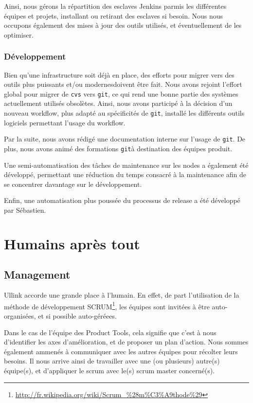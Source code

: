 \documentclass[a4paper, 12pt]{article}
\newcommand{\git}{\texttt{git}}
\begin{document}
Ainsi, nous gérons la répartition des esclaves Jenkins parmis les différentes équipes et projets, installant ou retirant des esclaves si besoin. Nous nous occupons également des mises à jour des outils utilisés, et éventuellement de les optimiser.

\subsubsection{Développement}

Bien qu'une infrastructure soit déjà en place, des efforts pour migrer vers des outils plus puissants et/ou modernesdoivent être fait. Nous avons rejoint l'effort global pour migrer de \texttt{cvs} vers \git, ce qui rend une bonne partie des systèmes actuellement utilisés obsolètes. Ainsi, nous avons participé à la décision d'un nouveau workflow, plus adapté au spécificités de \git, installé les différents outils logiciels permettant l'usage du workflow.

Par la suite, nous avons rédigé une documentation interne sur l'usage de \git. De plus, nous avons animé des formations \git à destination des équipes produit.

Une semi-automatisation des tâches de maintenance sur les nodes a également été développé, permettant une réduction du temps consacré à la maintenance afin de se concentrer davantage sur le développement.

Enfin, une automatisation plus poussée du processus de release a été développé par Sébastien.

\section{Humains après tout}

\subsection{Management}

Ullink accorde une grande place à l'humain. En effet, de part l'utilisation de la méthode de développement SCRUM\footnote{\url{http://fr.wikipedia.org/wiki/Scrum_\%28m\%C3\%A9thode\%29}}, les équipes sont invitées à être auto-organisées, et si possible auto-géréees.

Dans le cas de l'équipe des Product Tools, cela signifie que c'est à nous d'identifier les axes d'amélioration, et de proposer un plan d'action. Nous sommes également ammenés à communiquer avec les autres équipes pour récolter leurs besoins. Il nous arrive ainsi de travailler avec une (ou plusieurs) autre(s) équipe(s), et d'appliquer le scrum avec le(s) scrum master concerné(s).
\end{document}
